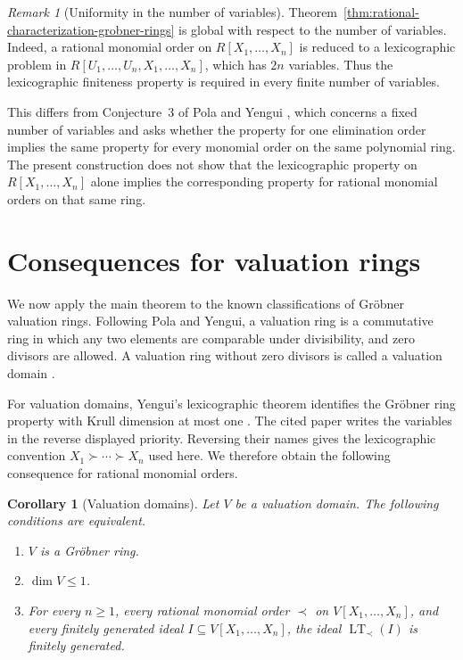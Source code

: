 \documentclass[preprint,12pt,3p]{elsarticle}
\newtheorem{corollary}[theorem]{Corollary}
\theoremstyle{definition}
\theoremstyle{remark}
\newtheorem{remark}[theorem]{Remark}
\newcommand{\LT}{\operatorname{LT}}
\begin{document}
	
\begin{remark}[Uniformity in the number of variables]
	\label{rem:scope-reduction}
	Theorem~\ref{thm:rational-characterization-grobner-rings} is
	global with respect to the number of variables. Indeed, a rational
	monomial order on $R[X_1,\ldots,X_n]$ is reduced to a
	lexicographic problem in
	$R[U_1,\ldots,U_n,X_1,\ldots,X_n]$, which has $2n$ variables.
	Thus the lexicographic finiteness property is required in every
	finite number of variables.
	
	This differs from Conjecture~3 of Pola and Yengui
	\cite{PolaYengui2014}, which concerns a fixed number of variables
	and asks whether the property for one elimination order implies the
	same property for every monomial order on the same polynomial ring.
	The present construction does not show that the lexicographic
	property on $R[X_1,\ldots,X_n]$ alone implies the corresponding
	property for rational monomial orders on that same ring.
\end{remark}
	
	\section{Consequences for valuation rings}
	\label{sec:valuation-rings}
	
	We now apply the main theorem to the known classifications of
	Gr\"obner valuation rings. Following Pola and Yengui, a valuation ring
	is a commutative ring in which any
	two elements are comparable under divisibility, and zero divisors are
	allowed. A valuation ring without zero divisors is called a valuation
	domain \cite{PolaYengui2014}.
	
	For valuation domains, Yengui's lexicographic theorem identifies the
	Gr\"obner ring property with Krull dimension at most one
	\cite{Yengui2014Lex}. The cited paper writes the variables in the
	reverse displayed priority. Reversing their names gives the
	lexicographic convention $X_1\succ\cdots\succ X_n$ used here. We
	therefore obtain the following consequence for rational monomial
	orders.
	
	\begin{corollary}[Valuation domains]
		\label{cor:rational-orders-valuation-domains}
		Let $V$ be a valuation domain. The following conditions are
		equivalent.
		\begin{enumerate}
			\item $V$ is a Gr\"obner ring.
			\item $\dim V\leq 1$.
			\item For every $n\geq 1$, every rational monomial order $\prec$ on
			$V[X_1,\ldots,X_n]$, and every finitely generated ideal
			$I\subseteq V[X_1,\ldots,X_n]$, the ideal $\LT_\prec(I)$ is finitely
			generated.
		\end{enumerate}
	\end{corollary}
	
\end{document}
